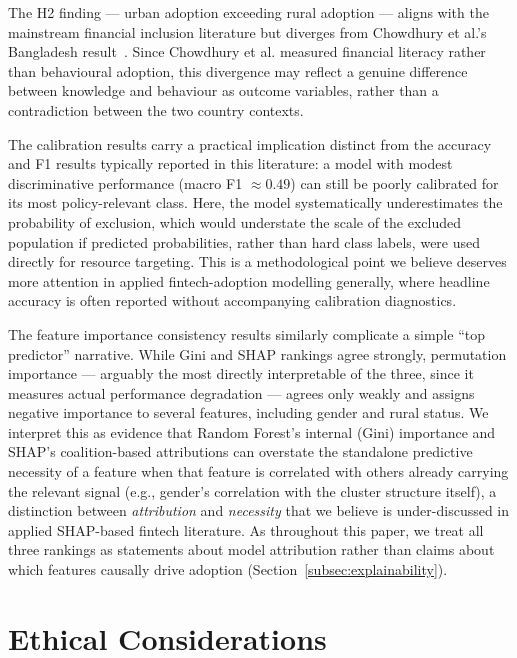 \documentclass[conference]{IEEEtran}
\begin{document}
The H2 finding --- urban adoption exceeding rural adoption --- aligns with
the mainstream financial inclusion literature but diverges from Chowdhury
et al.'s Bangladesh result~\cite{chowdhury2026}. Since Chowdhury et al.
measured financial literacy rather than behavioural adoption, this
divergence may reflect a genuine difference between knowledge and
behaviour as outcome variables, rather than a contradiction between the
two country contexts.

The calibration results carry a practical implication distinct from the
accuracy and F1 results typically reported in this literature: a model
with modest discriminative performance (macro F1 $\approx 0.49$) can still
be poorly calibrated for its most policy-relevant class. Here, the model
systematically underestimates the probability of exclusion, which would
understate the scale of the excluded population if predicted
probabilities, rather than hard class labels, were used directly for
resource targeting. This is a methodological point we believe deserves
more attention in applied fintech-adoption modelling generally, where
headline accuracy is often reported without accompanying calibration
diagnostics.

The feature importance consistency results similarly complicate a simple
``top predictor'' narrative. While Gini and SHAP rankings agree strongly,
permutation importance --- arguably the most directly interpretable of the
three, since it measures actual performance degradation --- agrees only
weakly and assigns negative importance to several features, including
gender and rural status. We interpret this as evidence that Random
Forest's internal (Gini) importance and SHAP's coalition-based
attributions can overstate the standalone predictive necessity of a
feature when that feature is correlated with others already carrying the
relevant signal (e.g., gender's correlation with the cluster structure
itself), a distinction between \emph{attribution} and \emph{necessity}
that we believe is under-discussed in applied SHAP-based fintech
literature. As throughout this paper, we treat all three rankings as
statements about model attribution rather than claims about which
features causally drive adoption (Section~\ref{subsec:explainability}).

\section{Ethical Considerations}
\label{sec:ethical_considerations}
\end{document}
